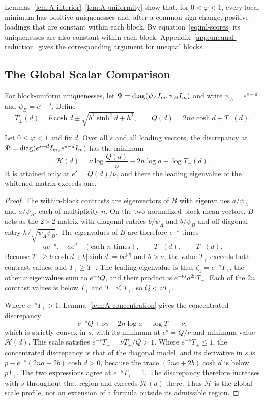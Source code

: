 Lemmas~\ref{lem:A-interior}--\ref{lem:A-uniformity} show that, for $0<\varphi<1$, every local minimum has positive uniquenesses and, after a common sign change, positive loadings that are constant within each block. By equation~\eqref{eq:ml-scores} its uniquenesses are also constant within each block. Appendix~\ref{app:unequal-reduction} gives the corresponding argument for unequal blocks.

\subsection{The Global Scalar Comparison}

For block-uniform uniquenesses, let $\Psi=\operatorname{diag}(\psi_AI_m,\psi_BI_m)$ and write $\psi_A=e^{s+d}$ and $\psi_B=e^{s-d}$. Define
\[
T_\pm(d)=b\cosh d\pm\sqrt{b^2\sinh^2d+h^2},
\qquad
Q(d)=2na\cosh d+T_-(d).
\]

\begin{applemma}
\label{lem:A-scale}
Let $0\le\varphi<1$ and fix $d$. Over all $s$ and all loading vectors, the discrepancy at $\Psi=\operatorname{diag}(e^{s+d}I_m,e^{s-d}I_m)$ has the minimum
\[
\mathcal H(d)=\nu \log\frac{Q(d)}\nu -2n\log a-\log T_-(d).
\]
It is attained only at $e^s=Q(d)/\nu$, and there the leading eigenvalue of the whitened matrix exceeds one.
\end{applemma}

\begin{proof}
The within-block contrasts are eigenvectors of $B$ with eigenvalues $a/\psi_A$ and $a/\psi_B$, each of multiplicity $n$. On the two normalized block-mean vectors, $B$ acts as the $2\times2$ matrix with diagonal entries $b/\psi_A$ and $b/\psi_B$ and off-diagonal entry $h/\sqrt{\psi_A\psi_B}$. The eigenvalues of $B$ are therefore $e^{-s}$ times
\[
ae^{-d},\quad ae^{d}\quad(\text{each $n$ times}),\qquad T_+(d),\qquad T_-(d).
\]
Because $T_+\ge b\cosh d+b|\sinh d|=be^{|d|}$ and $b>a$, the value $T_+$ exceeds both contrast values, and $T_+\ge T_-$. The leading eigenvalue is thus $\zeta_1=e^{-s}T_+$, the other $\nu$ eigenvalues sum to $e^{-s}Q$, and their product is $e^{-\nu s}a^{2n}T_-$. Each of the $2n$ contrast values is below $T_+$ and $T_-\le T_+$, so $Q<\nu T_+$.

Where $e^{-s}T_+>1$, Lemma~\ref{lem:A-concentration} gives the concentrated discrepancy
\[
e^{-s}Q+\nu s-2n\log a-\log T_- -\nu ,
\]
which is strictly convex in $s$, with its minimum at $e^s=Q/\nu$ and minimum value $\mathcal H(d)$. This scale satisfies $e^{-s}T_+=\nu T_+/Q>1$. Where $e^{-s}T_+\le1$, the concentrated discrepancy is that of the diagonal model, and its derivative in $s$ is $p-e^{-s}(2na+2b)\cosh d>0$, because the trace $(2na+2b)\cosh d$ is below $pT_+$. The two expressions agree at $e^{-s}T_+=1$. The discrepancy therefore increases with $s$ throughout that region and exceeds $\mathcal H(d)$ there. Thus $\mathcal H$ is the global scale profile, not an extension of a formula outside its admissible region.
\end{proof}

